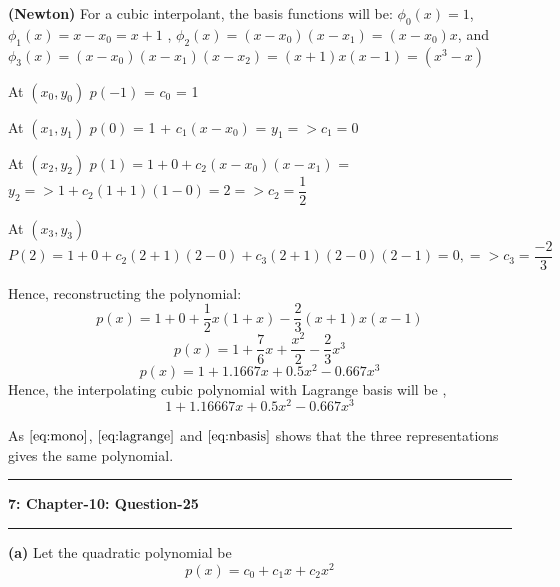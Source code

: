 \documentclass{article}
\newcommand\question[2]{\vspace{.25in}\hrule\textbf{#1: #2}\hrule\vspace{.10in}}
\renewcommand\part[1]{\vspace{.10in}\textbf{(#1)}}
\begin{document}
\part{Newton} For a cubic interpolant, the basis functions will be: \newline
$\phi_0(x) = 1$, $\phi_1(x) = x - x_0 = x+1$ , $\phi_2(x) = (x-x_0)(x-x_1) = (x-x_0)x$, and $\phi_3(x) = (x-x_0)(x-x_1)(x-x_2) = (x+1)x(x-1) = (x^3 - x)$ \newline

	At $(x_0,y_0)$ \newline
	$p(-1)$ = $c_0$ = 1 \newline

	At $(x_1, y_1)$ \newline
	$p(0)$ = 1 + $c_1(x-x_0)$ = $y_1 => c_1 = 0$ \newline

	At $(x_2, y_2)$ \newline
	$p(1) = 1 + 0 + c_2(x-x_0)(x-x_1)$ = $y_2 => 1 + c_2(1+1)(1-0) = 2 => c_2 = \dfrac{1}{2}$  \newline

	At $(x_3, y_3)$ \newline
	$P(2) = 1 + 0 + c_2(2+1)(2-0) + c_3(2+1)(2-0)(2-1) = 0, => c_3 = \dfrac{-2}{3}$ \newline

	Hence, reconstructing the polynomial:
	\[p(x) = 1 + 0 + \dfrac{1}{2}x(1+x) - \dfrac{2}{3}(x+1)x(x-1)\]
	\[p(x) = 1 + \dfrac{7}{6}x + \dfrac{x^2}{2} - \dfrac{2}{3}x^3 \]
	\[p(x) = 1 + 1.1667 x + 0.5 x^2 - 0.667 x^3\]
Hence, the interpolating cubic polynomial with Lagrange basis will be , \newline
\begin{equation}
1 + 1.16667 x + 0.5 x^2 - 0.667x^3 
	\label{eq:nbasis}
\end{equation}

	As $\eqref{eq:mono}$, $\eqref{eq:lagrange}$ and $\eqref{eq:nbasis}$ shows that the three representations gives the same polynomial. \newline


\question{7}{Chapter-10: Question-25}

\part{a} Let the quadratic polynomial be 
\begin{equation}
	p(x) = c_0 + c_1 x + c_2 x^2
	\label{eq:quad}
\end{equation}
\end{document}
